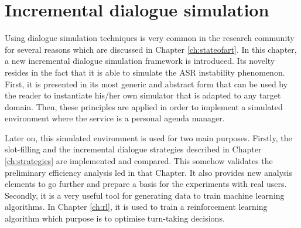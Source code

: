 \chapter{Incremental dialogue simulation}
\label{ch:simulation}

	
	Using dialogue simulation techniques is very common in the research community \cite{Eckert1997,Pietquin2013} for several reasons which are discussed in Chapter \ref{ch:stateofart}. In this chapter, a new incremental dialogue simulation framework is introduced. Its novelty resides in the fact that it is able to simulate the ASR instability phenomenon. First, it is presented in its most generic and abstract form that can be used by the reader to instantiate his/her own simulator that is adapted to any target domain. Then, these principles are applied in order to implement a simulated environment where the service is a personal agenda manager.
	
	Later on, this simulated environment is used for two main purposes. Firstly, the slot-filling and the incremental dialogue strategies described in Chapter \ref{ch:strategies} are implemented and compared. This somehow validates the preliminary efficiency analysis led in that Chapter. It also provides new analysis elements to go further and prepare a basis for the experiments with real users. Secondly, it is a very useful tool for generating data to train machine learning algorithms. In Chapter \ref{ch:rl}, it is used to train a reinforcement learning algorithm which purpose is to optimise turn-taking decisions.
	

